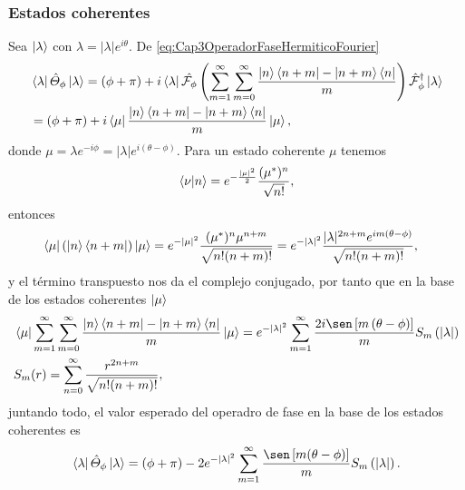             \subsubsection{Estados coherentes}
                
                Sea $\ket{\lambda}$ con $\lambda = |\lambda|e^{i\theta}$. De \ref{eq:Cap3OperadorFaseHermiticoFourier}
                \begin{align}
                    & \bra{\lambda} \hat{\Theta}_\phi \ket{\lambda} = (\phi + \pi) + i \bra{\lambda}\hat{\mathcal{F}_\phi} \left( \sum_{m=1}^{\infty}\sum_{m=0}^{\infty} \frac{\ket{n}\bra{n+m} - \ket{n+m}\bra{n}}{m} \right) \hat{\mathcal{F}}_\phi^\dagger  \ket{\lambda} \nonumber\\
                    & = (\phi + \pi) + i \bra{\mu} \frac{\ket{n}\bra{n+m} - \ket{n+m}\bra{n}}{m} \ket{\mu},
                \end{align}
                donde $\mu = \lambda e^{-i\phi} = |\lambda| e^{i(\theta-\phi)}$. Para un estado coherente $\mu$ tenemos
                \begin{equation*}
                    \braket{\nu | n} = e^{- \frac{|\mu|^2}{2}}\frac{(\mu^*)^n}{\sqrt{n!}},
                \end{equation*}
                entonces
                \begin{align*}
                    & \bra{\mu} \left(\ket{n}\bra{n+m}\right)\ket{\mu} = e^{-|\mu|^2} \frac{(\mu^*)^n \mu^{n+m}}{\sqrt{n!(n+m)!}} = e^{-|\lambda|^2} \frac{|\lambda|^{2n+m}e^{im(\theta-\phi)}}{\sqrt{n!(n+m)!}},
                \end{align*}
                y el término transpuesto nos da el complejo conjugado, por tanto que en la base de los estados coherentes $\ket{\mu}$
                \begin{align}
                    & \bra{\mu}\sum_{m=1}^{\infty}\sum_{m=0}^{\infty} \frac{\ket{n}\bra{n+m} - \ket{n+m}\bra{n}}{m} \ket{\mu} = e^{-|\lambda|^2} \sum_{m=1}^{\infty} \frac{2i \sen\left[m\left(\theta-\phi\right)\right]}{m}S_m\left(|\lambda|\right) \nonumber\\
                    & S_m(r) = \sum_{n=0}^{\infty} \frac{r^{2n+m}}{\sqrt{n!(n+m)!}},
                \end{align}
                juntando todo, el valor esperado del operadro de fase en la base de los estados coherentes es
                \begin{equation}
                    \bra{\lambda}\hat{\Theta}_\phi \ket{\lambda} = (\phi + \pi) - 2e^{-|\lambda|^2} \sum_{m=1}^{\infty} \frac{\sen\left[m(\theta-\phi)\right]}{m}S_m\left(|\lambda|\right).
                \end{equation}


